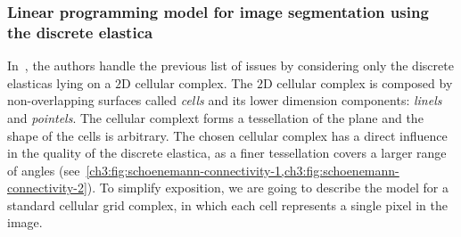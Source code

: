\subsubsection{Linear programming model for image segmentation using the discrete elastica}

In~\cite{schoenemann09linear}, the authors handle the previous list of issues by considering only the discrete elasticas lying on a $2$D cellular complex. The $2$D cellular complex is composed by non-overlapping surfaces called \emph{cells} and its lower dimension components: \emph{linels} and \emph{pointels}. The cellular complext forms a tessellation of the plane and the shape of the cells is arbitrary. The chosen cellular complex has a direct influence in the quality of the discrete elastica, as a finer tessellation covers a larger range of angles (see~\cref{ch3:fig:schoenemann-connectivity-1,ch3:fig:schoenemann-connectivity-2}). To simplify exposition, we are going to describe the model for a standard cellular grid complex, in which each cell represents a single pixel in the image.

